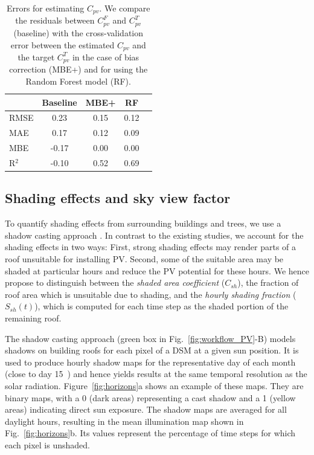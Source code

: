 \begin{table}[tb]
\centering
\footnotesize
\caption{Errors for estimating $C_{pv}$. We compare the residuals between $C_{pv}^F$ and $C_{pv}^T$ (baseline) with the cross-validation error between the estimated $C_{pv}$ and the target $C_{pv}^T$ in the case of bias correction (MBE+) and for using the Random Forest model (RF).}
\label{tab:errors_Cpv}
\begin{tabular}{lcccc}
\hline
      & \textbf{Baseline} & \textbf{MBE+}  & \textbf{RF}   \\ \hline
RMSE  & 0.23     & 0.15  & 0.12 \\
MAE   & 0.17     & 0.12  & 0.09 \\
MBE   & -0.17    & 0.00  & 0.00 \\
R$^2$ & -0.10    & 0.52  & 0.69 \\ \hline
\end{tabular}
\end{table}


\subsection{Shading effects and sky view factor}
\label{shade}
\label{svf}

To quantify shading effects from surrounding buildings and trees, we use a shadow casting approach \cite{buffat_scalable_2018, desthieux_solar_2018, klauser_solarpotentialanalyse_2016, ramirez_camargo_spatio-temporal_2015}. 
In contrast to the existing studies, we account for the shading effects in two ways:
First, strong shading effects may render parts of a roof unsuitable for installing PV. 
Second, some of the suitable area may be shaded at particular hours and reduce the PV potential for these hours. We hence propose to distinguish between the \textit{shaded area coefficient} ($C_{sh}$), the fraction of roof area which is unsuitable due to shading, and the \textit{hourly shading fraction} ($S_{sh}(t)$), which is computed for each time step as the shaded portion of the remaining roof. 

The shadow casting approach (green box in Fig.~\ref{fig:workflow_PV}-B) models shadows on building roofs for each pixel of a DSM at a given sun position. It is used to produce hourly shadow maps for the representative day of each month (close to day 15~\cite{desthieux_solar_2018}) and hence yields results at the same temporal resolution as the solar radiation.
Figure~\ref{fig:horizons}a shows an example of these maps. They are binary maps, with a 0 (dark areas) representing a cast shadow and a 1 (yellow areas) indicating direct sun exposure. The shadow maps are averaged for all daylight hours, resulting in the mean illumination map shown in Fig.~\ref{fig:horizons}b. Its values represent the percentage of time steps for which each pixel is unshaded.


